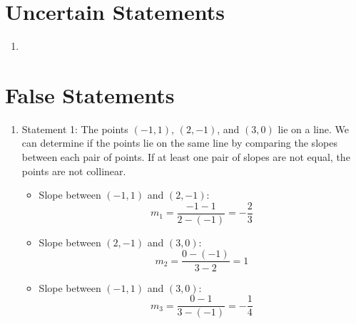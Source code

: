 \documentclass{article}
\begin{document}
\section{Uncertain Statements}

\begin{enumerate}
    \item
\end{enumerate}

\section{False Statements}

\begin{enumerate}
    \item Statement 1: The points $(-1,1)$, $(2,-1)$, and $(3,0)$ lie on a line.\newline
          We can determine if the points lie on the same line by comparing the slopes between each pair of points.
          If at least one pair of slopes are not equal, the points are not collinear.

          \begin{itemize}
              \item Slope between \((-1, 1)\) and \((2, -1)\):
                    \[
                        m_1 = \frac{-1 - 1}{2 - (-1)} = -\frac{2}{3}
                    \]

              \item Slope between \((2, -1)\) and \((3, 0)\):
                    \[
                        m_2 = \frac{0 - (-1)}{3 - 2} = 1
                    \]

              \item Slope between \((-1, 1)\) and \((3, 0)\):
                    \[
                        m_3 = \frac{0 - 1}{3 - (-1)} = -\frac{1}{4}
                    \]
          \end{itemize}


\end{enumerate}
\end{document}
